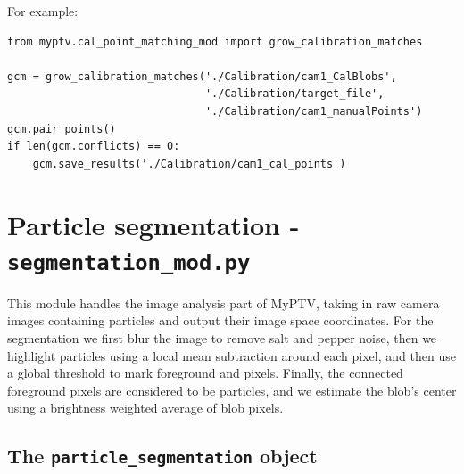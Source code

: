 \documentclass[10pt,a4paper]{article}
\begin{document}
For example:
\begin{verbatim}
from myptv.cal_point_matching_mod import grow_calibration_matches

gcm = grow_calibration_matches('./Calibration/cam1_CalBlobs',
                               './Calibration/target_file',
                               './Calibration/cam1_manualPoints')
gcm.pair_points()
if len(gcm.conflicts) == 0:
    gcm.save_results('./Calibration/cam1_cal_points')
\end{verbatim}












\section{Particle segmentation - \texttt{segmentation\_mod.py}} 


This module handles the image analysis part of MyPTV, taking in raw camera images containing particles and output their image space coordinates. For the segmentation we first blur the image to remove salt and pepper noise, then we highlight particles using a local mean subtraction around each pixel, and then use a global threshold to mark foreground and  pixels. Finally, the connected foreground pixels are considered to be particles, and we estimate the blob's center using a brightness weighted average of blob pixels.



\subsection{The \texttt{particle\_segmentation} object} 
\end{document}
